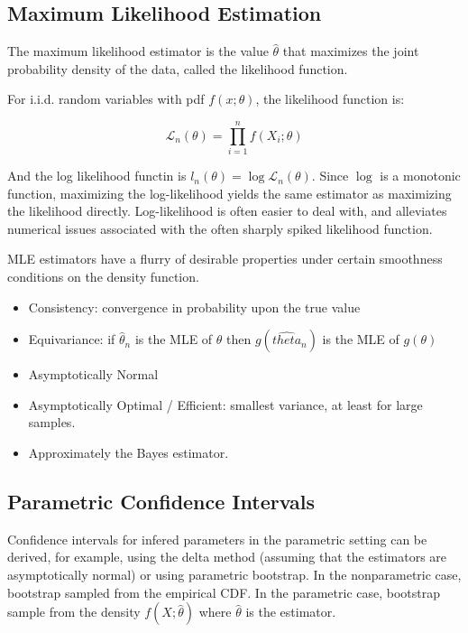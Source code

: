 \subsection{Maximum Likelihood Estimation}

The maximum likelihood estimator is the value $\hat{\theta}$ that maximizes the joint probability density of the data, called the likelihood function. 

For i.i.d. random variables with pdf $f(x;\theta)$, the likelihood function is:

\begin{equation}
\mathscr{L}_n(\theta) = \prod_{i=1}^n f(X_i;\theta)
\end{equation}

And the log likelihood functin is $l_n(\theta) = \log \mathscr{L}_n(\theta)$. Since $\log$ is a monotonic function, maximizing the log-likelihood yields the same estimator as maximizing the likelihood directly. Log-likelihood is often easier to deal with, and alleviates numerical issues associated with the often sharply spiked likelihood function. 

MLE estimators have a flurry of desirable properties under certain smoothness conditions on the density function. 

\begin{itemize}
\item Consistency: convergence in probability upon the true value
\item Equivariance: if $\hat{\theta}_n$ is the MLE of $\theta$ then $g(\hat{theta}_n)$ is the MLE of $g(\theta)$
\item Asymptotically Normal
\item Asymptotically Optimal / Efficient: smallest variance, at least for large samples.
\item Approximately the Bayes estimator.
\end{itemize}


\subsection{Parametric Confidence Intervals}

Confidence intervals for infered parameters in the parametric setting can be derived, for example, using the delta method (assuming that the estimators are asymptotically normal) or using parametric bootstrap. In the nonparametric case, bootstrap sampled from the empirical CDF. In the parametric case, bootstrap sample from the density $f(X;\hat{\theta})$ where $\hat{\theta}$ is the estimator.


